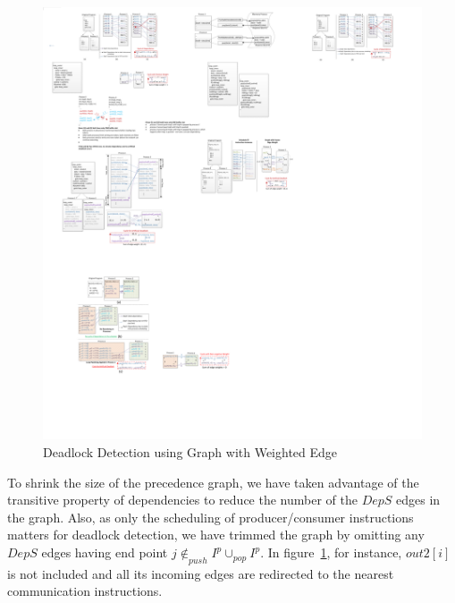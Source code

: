 \begin{figure}[htp]
\begin{center}
\includegraphics[width=0.8\linewidth]{chap4fig/singlelevelLoopCycle2.pdf}
\caption{Deadlock Detection using Graph with Weighted Edge
\label{fig:singlelevelLoopCylce}}
\end{center}
\end{figure}

To shrink the size of the precedence graph, we have taken advantage of the transitive property of dependencies to reduce the number of the $DepS$ edges in the graph.
Also, as only the scheduling of producer/consumer instructions matters for
deadlock detection, we have trimmed the graph by omitting any $DepS$ edges having end point
$j \not\in _{push}{I^p} \cup _{pop}{I^p}$. 
In figure~\ref{fig:singlelevelLoopCylce}, for instance, $out2[i]$ is not included and all
its incoming edges are redirected to the nearest communication instructions.







